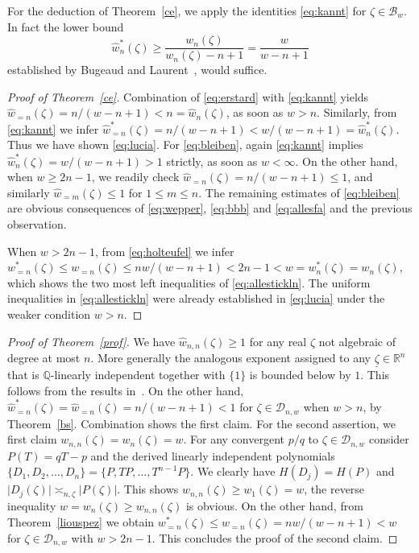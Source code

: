 \documentclass[12pt]{amsart}
\theoremstyle{definition}
\begin{document}
For the deduction of Theorem~\ref{ce}, 
we apply the identities \eqref{eq:kannt} for $\zeta\in\mathscr{B}_{w}$. 
In fact the lower bound
%
\begin{equation} \label{eq:donduck}
\widehat{w}_{n}^{\ast}(\zeta)\geq \frac{w_{n}(\zeta)}{w_{n}(\zeta)-n+1}
= \frac{w}{w-n+1}
\end{equation}
%
established
by Bugeaud and Laurent~\cite[Theorem~2.1]{buglaur},
would suffice.

\begin{proof}[Proof of Theorem~\ref{ce}]
Combination of \eqref{eq:erstard} with \eqref{eq:kannt} yields 
$\widehat{w}_{=n}(\zeta)= n/(w-n+1)<n=\widehat{w}_{n}(\zeta)$, as soon as $w>n$. 
Similarly, from \eqref{eq:kannt} we infer $\widehat{w}_{=n}^{\ast}(\zeta)=n/(w-n+1)<w/(w-n+1)=\widehat{w}_{n}^{\ast}(\zeta)$.
Thus we have shown \eqref{eq:lucia}.
For \eqref{eq:bleiben}, again \eqref{eq:kannt}
implies $\widehat{w}_{n}^{\ast}(\zeta)=w/(w-n+1)>1$ strictly, 
as soon as $w<\infty$. On the other hand, when $w\geq 2n-1$, we readily check $\widehat{w}_{=n}(\zeta)= n/(w-n+1)\leq 1$,
and similarly $\widehat{w}_{=m}(\zeta)\leq 1$ for $1\leq m\leq n$.
The remaining estimates of \eqref{eq:bleiben} are obvious consequences of \eqref{eq:wepper}, \eqref{eq:bbb} and \eqref{eq:allesfa}
and the previous observation.

When $w>2n-1$, from \eqref{eq:holteufel} we infer $w_{=n}^{\ast}(\zeta)\leq w_{=n}(\zeta)\leq nw/(w-n+1)< 2n-1<w
= w_{n}^{\ast}(\zeta)=w_{n}(\zeta)$, which shows the two most left inequalities of \eqref{eq:allestickln}.
The uniform inequalities in \eqref{eq:allestickln} were already established in \eqref{eq:lucia} under the weaker condition $w>n$.
\end{proof}

\begin{proof} [Proof of Theorem~\ref{prof}]
We have $\widehat{w}_{n,n}(\zeta)\geq 1$ for any real 
$\zeta$ not algebraic of degree at most $n$. More
generally the analogous exponent assigned to any
$\underline{\zeta}\in\mathbb{R}^{n}$ that is $\mathbb{Q}$-linearly
independent together with $\{1\}$ is bounded below by $1$.
This follows from the results in~\cite{ss}. On the other hand, 
$\widehat{w}_{=n}^{\ast}(\zeta)=\widehat{w}_{=n}(\zeta)=n/(w-n+1)<1$ 
for $\zeta\in\mathscr{D}_{n,w}$ when $w>n$, by Theorem~\ref{bs}. 
Combination shows the first claim.
For the second assertion,
we first claim $w_{n,n}(\zeta)=w_{n}(\zeta)=w$. 
For any convergent $p/q$ to $\zeta\in\mathscr{D}_{n,w}$
consider $P(T)=qT-p$ and the derived linearly independent polynomials 
$\{D_{1},D_{2},\ldots,D_{n}\}=\{ P,TP,\ldots,T^{n-1}P\}$. 
We clearly have $H(D_{j})=H(P)$
and $\vert D_{j}(\zeta)\vert \asymp_{n,\zeta} \vert P(\zeta)\vert$. This shows $w_{n,n}(\zeta)\geq w_{1}(\zeta)=w$,
the reverse inequality $w=w_{n}(\zeta)\geq w_{n,n}(\zeta)$ is obvious.
On the other hand, from Theorem~\ref{liouspez} we obtain
$w_{=n}^{\ast}(\zeta)\leq w_{=n}(\zeta)=nw/(w-n+1)<w$ for
$\zeta\in\mathscr{D}_{n,w}$ with $w>2n-1$. This concludes the proof
of the second claim.   
\end{proof}
\end{document}
